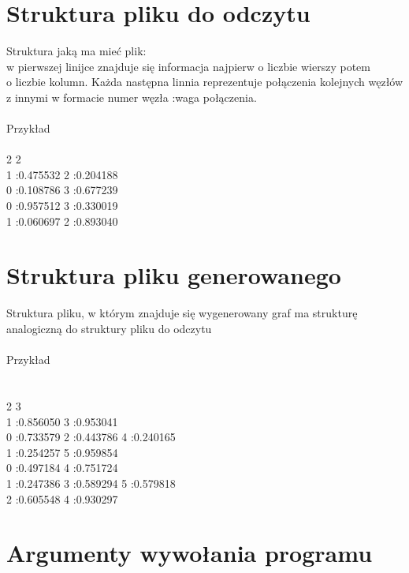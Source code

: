 \documentclass[12pt]{article}
\begin{document}
\section{Struktura pliku do odczytu}\label{header-n256}
Struktura jaką ma mieć plik: \\
w pierwszej linijce znajduje się informacja najpierw o liczbie wierszy potem\\ o liczbie kolumn.
Każda następna linnia reprezentuje połączenia kolejnych węzłów z innymi w formacie numer węzła :waga połączenia.\\
\\
Przykład\\
\\
2 2\\
1 :0.475532  2 :0.204188  \\
0 :0.108786  3 :0.677239  \\
0 :0.957512  3 :0.330019  \\
1 :0.060697  2 :0.893040  \\

\section{Struktura pliku generowanego
}\label{header-n279}
Struktura pliku, w którym znajduje się wygenerowany graf ma strukturę analogiczną do struktury pliku do odczytu\\
\\
Przykład\\
\\
\\
2 3\\
1 :0.856050  3 :0.953041  \\
0 :0.733579  2 :0.443786  4 :0.240165  \\
1 :0.254257  5 :0.959854  \\
0 :0.497184  4 :0.751724  \\
1 :0.247386  3 :0.589294  5 :0.579818  \\
2 :0.605548  4 :0.930297  \\


\section{Argumenty wywołania programu
}\label{header-n281}
\end{document}
